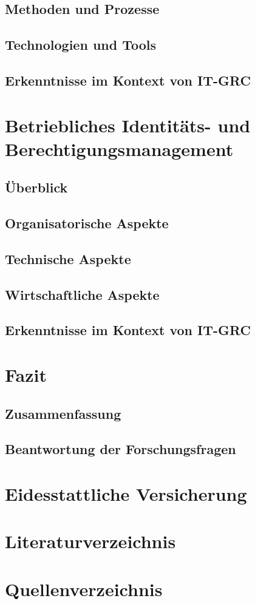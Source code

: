 \documentclass[10pt]{article}
\begin{document}
\subsection{Methoden und Prozesse}
\subsection{Technologien und Tools}
\subsection{Erkenntnisse im Kontext von IT-GRC}
\section{Betriebliches Identitäts- und Berechtigungsmanagement}
\subsection{Überblick}
\subsection{Organisatorische Aspekte}
\subsection{Technische Aspekte}
\subsection{Wirtschaftliche Aspekte}
\subsection{Erkenntnisse im Kontext von IT-GRC}
\section{Fazit}
\subsection{Zusammenfassung}
\subsection{Beantwortung der Forschungsfragen}
\section{Eidesstattliche Versicherung}
\section{Literaturverzeichnis}
\section{Quellenverzeichnis}
\printbibliography
\end{document}
